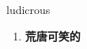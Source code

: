 
\begin{frame}
{\huge ludicrous}
\begin{center}
\begin{enumerate}\Large
  \item \textbf{荒唐可笑的}
\end{enumerate}
\end{center}
\end{frame}
